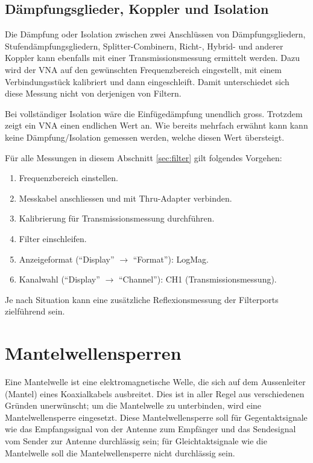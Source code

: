 \documentclass[twoside,a4paper,11pt,halfparskip,DIV=11,notitlepage]{scrartcl}
\begin{document}
\subsection{Dämpfungsglieder, Koppler und Isolation}
Die Dämpfung oder Isolation zwischen zwei Anschlüssen von Dämpfungsgliedern,
Stufendämpfungsgliedern, Splitter-Combinern, Richt-, Hybrid- und anderer Koppler
kann ebenfalls mit einer Transmissionsmessung ermittelt werden. Dazu wird der VNA auf den
gewünschten Frequenzbereich eingestellt, mit einem Verbindungsstück kalibriert
und dann eingeschleift. Damit unterschiedet sich diese Messung nicht von derjenigen
von Filtern.

Bei vollständiger Isolation wäre die Einfügedämpfung unendlich gross. Trotzdem
zeigt ein VNA einen endlichen Wert an. Wie bereits mehrfach erwähnt kann kann
keine Dämpfung/Isolation gemessen werden, welche diesen Wert übersteigt.

Für alle Messungen in diesem Abschnitt \ref{sec:filter} gilt folgendes Vorgehen:

\begin{enumerate}
    \item Frequenzbereich einstellen.
    \item Messkabel anschliessen und mit Thru-Adapter verbinden.
    \item Kalibrierung für Transmissionsmessung durchführen.
    \item Filter einschleifen.
    \item Anzeigeformat (``Display'' $\longrightarrow$ ``Format''): LogMag.
    \item Kanalwahl (``Display'' $\longrightarrow$ ``Channel''): CH1 (Transmissionsmessung).
\end{enumerate}

Je nach Situation kann eine zusätzliche Reflexionsmessung der Filterports zielführend sein.

\newpage %
\section{Mantelwellensperren}
Eine Mantelwelle ist eine elektromagnetische Welle, die sich auf dem Aussenleiter (Mantel) eines
Koaxialkabels ausbreitet. Dies ist in aller Regel aus verschiedenen Gründen
unerwünscht; um die Mantelwelle zu unterbinden, wird eine Mantelwellensperre
eingesetzt. Diese Mantelwellensperre soll für Gegentaktsignale wie das
Empfangssignal von der Antenne zum Empfänger und das Sendesignal vom Sender
zur Antenne durchlässig sein; für Gleichtaktsignale wie die Mantelwelle soll
die Mantelwellensperre nicht durchlässig sein.
\end{document}
